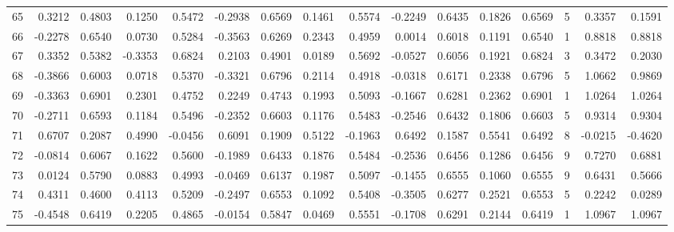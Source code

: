 \begin{tabular}{lrrrrrrrrrrrrrrr}
65  &      0.3212 &  0.4803 &  0.1250 &  0.5472 & -0.2938 &  0.6569 &  0.1461 &  0.5574 & -0.2249 &  0.6435 &   0.1826 &     0.6569 &      5 &                    0.3357 &                     0.1591 \\
66  &     -0.2278 &  0.6540 &  0.0730 &  0.5284 & -0.3563 &  0.6269 &  0.2343 &  0.4959 &  0.0014 &  0.6018 &   0.1191 &     0.6540 &      1 &                    0.8818 &                     0.8818 \\
67  &      0.3352 &  0.5382 & -0.3353 &  0.6824 &  0.2103 &  0.4901 &  0.0189 &  0.5692 & -0.0527 &  0.6056 &   0.1921 &     0.6824 &      3 &                    0.3472 &                     0.2030 \\
68  &     -0.3866 &  0.6003 &  0.0718 &  0.5370 & -0.3321 &  0.6796 &  0.2114 &  0.4918 & -0.0318 &  0.6171 &   0.2338 &     0.6796 &      5 &                    1.0662 &                     0.9869 \\
69  &     -0.3363 &  0.6901 &  0.2301 &  0.4752 &  0.2249 &  0.4743 &  0.1993 &  0.5093 & -0.1667 &  0.6281 &   0.2362 &     0.6901 &      1 &                    1.0264 &                     1.0264 \\
70  &     -0.2711 &  0.6593 &  0.1184 &  0.5496 & -0.2352 &  0.6603 &  0.1176 &  0.5483 & -0.2546 &  0.6432 &   0.1806 &     0.6603 &      5 &                    0.9314 &                     0.9304 \\
71  &      0.6707 &  0.2087 &  0.4990 & -0.0456 &  0.6091 &  0.1909 &  0.5122 & -0.1963 &  0.6492 &  0.1587 &   0.5541 &     0.6492 &      8 &                   -0.0215 &                    -0.4620 \\
72  &     -0.0814 &  0.6067 &  0.1622 &  0.5600 & -0.1989 &  0.6433 &  0.1876 &  0.5484 & -0.2536 &  0.6456 &   0.1286 &     0.6456 &      9 &                    0.7270 &                     0.6881 \\
73  &      0.0124 &  0.5790 &  0.0883 &  0.4993 & -0.0469 &  0.6137 &  0.1987 &  0.5097 & -0.1455 &  0.6555 &   0.1060 &     0.6555 &      9 &                    0.6431 &                     0.5666 \\
74  &      0.4311 &  0.4600 &  0.4113 &  0.5209 & -0.2497 &  0.6553 &  0.1092 &  0.5408 & -0.3505 &  0.6277 &   0.2521 &     0.6553 &      5 &                    0.2242 &                     0.0289 \\
75  &     -0.4548 &  0.6419 &  0.2205 &  0.4865 & -0.0154 &  0.5847 &  0.0469 &  0.5551 & -0.1708 &  0.6291 &   0.2144 &     0.6419 &      1 &                    1.0967 &                     1.0967 \\

\end{tabular}
